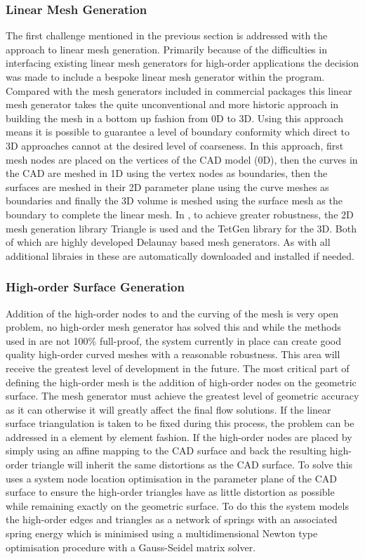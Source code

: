 \subsubsection{Linear Mesh Generation}

The first challenge mentioned in the previous section is addressed with the
\mc approach to linear mesh generation. Primarily because of the
difficulties in interfacing existing linear mesh generators for high-order
applications the decision was made to include a bespoke linear mesh generator
within the program. Compared with the mesh generators included in commercial
packages this linear mesh generator takes the quite unconventional and more
historic approach in building the mesh in a bottom up fashion from 0D to 3D.
Using this approach means it is possible to guarantee a level of boundary
conformity which direct to 3D approaches cannot at the desired level of
coarseness. In this approach, first mesh nodes are placed on the vertices of
the CAD model (0D), then the curves in the CAD are meshed in 1D using the
vertex nodes as boundaries, then the surfaces are meshed in their 2D parameter
plane using the curve meshes as boundaries and finally the 3D volume is meshed
using the surface mesh as the boundary to complete the linear mesh. In \mc, to
achieve greater robustness, the 2D mesh generation library Triangle is used and
the TetGen library for the 3D. Both of which are highly developed Delaunay based
mesh generators. As with all additional libraies in \nekpp these are
automatically downloaded and installed if needed.

\subsubsection{High-order Surface Generation}

Addition of the high-order nodes to and the curving of the mesh is very open
problem, no high-order mesh generator has solved this and while the methods
used in \mc are not 100\% full-proof, the system currently in place can create
good quality high-order curved meshes with a reasonable robustness. This area
will receive the greatest level of development in the future. The most critical
part of defining the high-order mesh is the addition of high-order nodes on the
geometric surface. The mesh generator must achieve the greatest level of
geometric accuracy as it can otherwise it will greatly affect the final flow
solutions. If the linear surface triangulation is taken to be fixed during this
process, the problem can be addressed in a element by element fashion. If the
high-order nodes are placed by simply using an affine mapping to the CAD surface
and back the resulting high-order triangle will inherit the same distortions as
the CAD surface. To solve this \mc uses a system node location optimisation in
the parameter plane of the CAD surface to ensure the high-order triangles have
as little distortion as possible while remaining exactly on the geometric
surface. To do this the system models the high-order edges and triangles as a
network of springs with an associated spring energy which is minimised using a
multidimensional Newton type optimisation procedure with a Gauss-Seidel matrix
solver.

